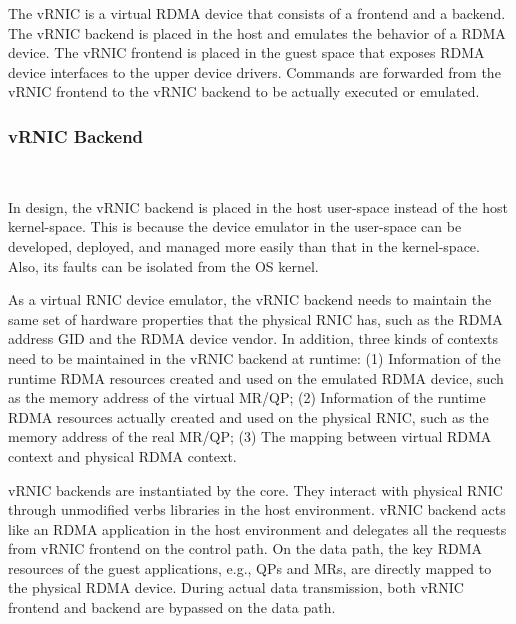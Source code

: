 
The vRNIC is a virtual RDMA device that consists of a frontend and a backend. The vRNIC backend is placed in the host and emulates the behavior of a RDMA device. The vRNIC frontend is placed in the guest space that exposes RDMA device interfaces to the upper device drivers. Commands are forwarded from the vRNIC frontend to the vRNIC backend to be actually executed or emulated.

\subsubsection{\textbf{vRNIC Backend}}
\
\noindent



In \sys design, the vRNIC backend is placed in the host user-space instead of the host kernel-space. This is because the device emulator in the user-space can be developed, deployed, and managed more easily than that in the kernel-space. Also, its faults can be isolated from the OS kernel.


As a virtual RNIC device emulator, the vRNIC backend needs to maintain the same set of hardware properties that the physical RNIC has, such as the RDMA address GID and the RDMA device vendor. In addition, three kinds of contexts need to be maintained in the vRNIC backend at runtime:
(1) Information of the runtime RDMA resources created and used on the emulated RDMA device, such as the memory address of the virtual MR/QP;
(2) Information of the runtime RDMA resources actually created and used on the physical RNIC, such as the memory address of the real MR/QP;
(3) The mapping between virtual RDMA context and physical RDMA context.

vRNIC backends are instantiated by the \sys core. They interact with physical RNIC through unmodified verbs libraries in the host environment. vRNIC backend acts like an RDMA application in the host environment and delegates all the requests from vRNIC frontend on the control path. On the data path, the key RDMA resources of the guest applications, e.g., QPs and MRs, are directly mapped to the physical RDMA device. During actual data transmission, both vRNIC frontend and backend are bypassed on the data path.

